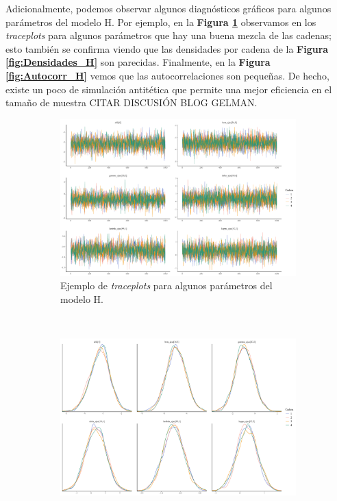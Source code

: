  Adicionalmente, podemos observar algunos diagnósticos gráficos para algunos parámetros del modelo H. Por ejemplo, en la \textbf{Figura \ref{fig:Traceplots_H}} observamos en los \textit{traceplots} para algunos parámetros que hay una buena mezcla de las cadenas; esto también se confirma viendo que las densidades por cadena de la \textbf{Figura \ref{fig:Densidades_H}} son parecidas. Finalmente, en la \textbf{Figura \ref{fig:Autocorr_H}} vemos que las autocorrelaciones son pequeñas. De hecho, existe un poco de simulación antitética que permite una mejor eficiencia en el tamaño de muestra {\color{Red} CITAR DISCUSIÓN BLOG GELMAN}.\\ 
 
 \begin{figure}[h]
	\centering
	\begin{subfigure}{0.45\textwidth}
	\includegraphics[width = \textwidth]{Figs/Convergencia/Convergencia_Traceplots}
	\caption{Ejemplo de \textit{traceplots} para algunos parámetros del modelo H.}
	\label{fig:Traceplots_H}
	\end{subfigure}
	~
	\begin{subfigure}{0.45\textwidth}
	\includegraphics[width = \textwidth]{Figs/Convergencia/Convergencia_Densidades}

\end{subfigure}
\end{figure}
